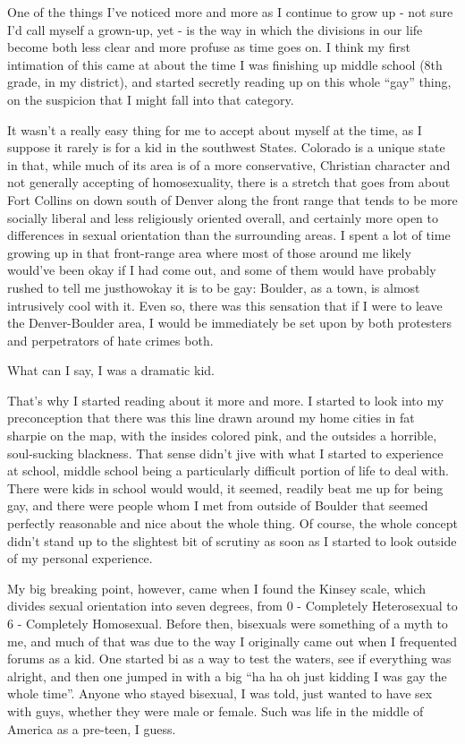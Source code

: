 
One of the things I've noticed more and more as I continue to grow up - not sure I'd call myself a grown-up, yet - is the way in which the divisions in our life become both less clear and more profuse as time goes on. I think my first intimation of this came at about the time I was finishing up middle school (8th grade, in my district), and started secretly reading up on this whole ``gay'' thing, on the suspicion that I might fall into that category.

It wasn't a really easy thing for me to accept about myself at the time, as I suppose it rarely is for a kid in the southwest States. Colorado is a unique state in that, while much of its area is of a more conservative, Christian character and not generally accepting of homosexuality, there is a stretch that goes from about Fort Collins on down south of Denver along the front range that tends to be more socially liberal and less religiously oriented overall, and certainly more open to differences in sexual orientation than the surrounding areas. I spent a lot of time growing up in that front-range area where most of those around me likely would've been okay if I had come out, and some of them would have probably rushed to tell me justhowokay it is to be gay: Boulder, as a town, is almost intrusively cool with it. Even so, there was this sensation that if I were to leave the Denver-Boulder area, I would be immediately be set upon by both protesters and perpetrators of hate crimes both.

What can I say, I was a dramatic kid.

That's why I started reading about it more and more. I started to look into my preconception that there was this line drawn around my home cities in fat sharpie on the map, with the insides colored pink, and the outsides a horrible, soul-sucking blackness. That sense didn't jive with what I started to experience at school, middle school being a particularly difficult portion of life to deal with. There were kids in school would would, it seemed, readily beat me up for being gay, and there were people whom I met from outside of Boulder that seemed perfectly reasonable and nice about the whole thing. Of course, the whole concept didn't stand up to the slightest bit of scrutiny as soon as I started to look outside of my personal experience.

My big breaking point, however, came when I found the Kinsey scale, which divides sexual orientation into seven degrees, from 0 - Completely Heterosexual to 6 - Completely Homosexual. Before then, bisexuals were something of a myth to me, and much of that was due to the way I originally came out when I frequented forums as a kid. One started bi as a way to test the waters, see if everything was alright, and then one jumped in with a big ``ha ha oh just kidding I was gay the whole time''. Anyone who stayed bisexual, I was told, just wanted to have sex with guys, whether they were male or female. Such was life in the middle of America as a pre-teen, I guess.

